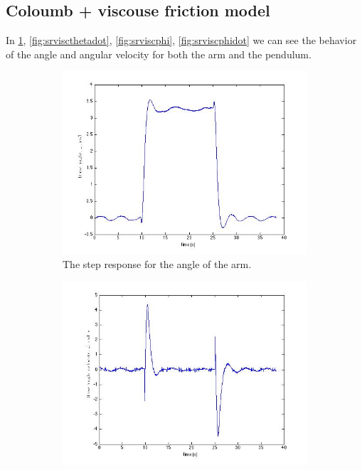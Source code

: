 \documentclass[10pt,a4paper]{article}
\begin{document}
\subsection{Coloumb + viscouse friction model}
In \ref{subfigure:srvisctheta}, \ref{fig:srviscthetadot}, \ref{fig:srviscphi}, \ref{fig:srviscphidot} we can see the behavior of the angle and angular velocity for both the arm and the pendulum.
\begin{figure}[H]
\centering
		\begin{subfigure}[t]{0.49\textwidth}
			\includegraphics[scale=0.33]{plots/steprespviscphi.jpg}
			\centering
			\caption{The step response for the angle of the arm.}
			\label{subfigure:srvisctheta}
		\end{subfigure}
		\begin{subfigure}[t]{0.49\textwidth}
			\includegraphics[scale=0.33]{plots/steprespviscphidot.jpg}

\end{subfigure}
\end{figure}
\end{document}
